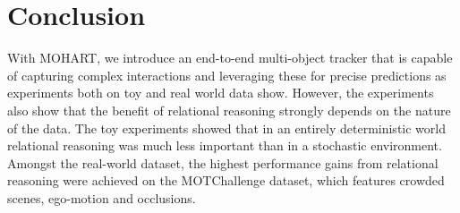 \section{Conclusion}
\label{sec:mohart_discussion}

With MOHART, we introduce an end-to-end multi-object tracker that is capable of capturing complex interactions and leveraging these for precise predictions as experiments both on toy and real world data show. However, the experiments also show that the benefit of relational reasoning strongly depends on the nature of the data. The toy experiments showed that in an entirely deterministic world relational reasoning was much less important than in a stochastic environment. Amongst the real-world dataset, the highest performance gains from relational reasoning were achieved on the MOTChallenge dataset, which features crowded scenes, ego-motion and occlusions.
